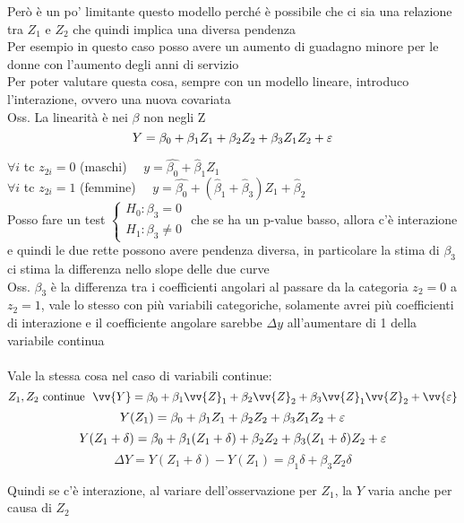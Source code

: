 Però è un po' limitante questo modello perché è possibile che ci sia una relazione tra $Z_1$ e $Z_2$ che quindi implica una diversa pendenza\\

Per esempio in questo caso posso avere un aumento di guadagno minore per le donne con l'aumento degli anni di servizio\\

Per poter valutare questa cosa, sempre con un modello lineare, introduco l'interazione, ovvero una nuova covariata\\

Oss. La linearità è nei $\beta$ non negli Z
\[
Y=\beta_0+\beta_1Z_1 + \beta_2Z_2 +\beta_3 Z_1Z_2 + \varepsilon
\]

$\forall i$ tc $z_{2i}=0$ (maschi) \ \ $y=\hat{\beta_0}+\hat{\beta}_1Z_1$\\
$\forall i$ tc $z_{2i}=1$ (femmine) \ \ $y=\hat{\beta_0}+(\hat{\beta}_1+\hat{\beta}_3)Z_1+\hat{\beta}_2$\\ 


Posso fare un test $\begin{cases}
    H_0 : \beta_3=0\\
    H_1 : \beta_3 \ne 0
\end{cases}$ che se ha un p-value basso, allora c'è interazione e quindi le due rette possono avere pendenza diversa, in particolare la stima di $\beta_3$ ci stima la differenza nello slope delle due curve\\



Oss. $\beta_3$ è la differenza tra i coefficienti angolari al passare da la categoria $z_2=0$ a $z_2=1$, vale lo stesso con più variabili categoriche, solamente avrei più coefficienti di interazione e il coefficiente angolare sarebbe $\Delta y$ all'aumentare di 1 della variabile continua \\ \\

Vale la stessa cosa nel caso di variabili continue:
\[
Z_1, Z_2 \text{ continue} \ \ \vv{Y}=\beta_0 + \beta_1 \vv{Z}_1 + \beta_2 \vv{Z}_2 + \beta_3 \vv{Z}_1\vv{Z}_2 + \vv{\eps}\]
\[
Y(Z_1)= \beta_0 + \beta_1 Z_1 + \beta_2 Z_2 + \beta_3 Z_1Z_2 + \varepsilon
\]
\[
Y(Z_1+\delta)= \beta_0 + \beta_1 (Z_1+\delta) + \beta_2 Z_2 + \beta_3 (Z_1+\delta)Z_2 + \varepsilon
\]
\[
\Delta Y = Y(Z_1+\delta)-Y(Z_1) = \beta_1 \delta + \beta_3Z_2\delta
\]

Quindi se c'è interazione, al variare dell'osservazione per $Z_1$, la $Y$ varia anche per causa di $Z_2$

